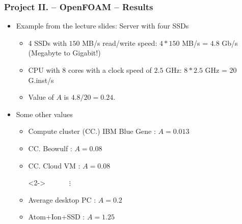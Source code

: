 \begin{frame}
\frametitle{Project II. -- OpenFOAM -- Results}

\begin{itemize}
	\item<1-> Example from the lecture slides: Server with four SSDs
	\begin{itemize}
		\item<1-> 4 SSDs with $150$ MB/s read/write speed: $4 * 150$ MB/s = $4.8$ Gb/s (Megabyte to Gigabit!)
		\item<1-> CPU with 8 cores with a clock speed of $2.5$ GHz: $8 * 2.5$ GHz = $20$ G.inst/s
		\item<1-> Value of $A$ is $4.8 / 20 = 0.24$.
	\end{itemize}
	\item<2-> Some other values
	\begin{itemize}
		\item<2-> Compute cluster (CC.) IBM Blue Gene : $A = 0.013$
		\item<2-> CC. Beowulf : $A = 0.08$
		\item<2-> CC. Cloud VM : $A = 0.08$
		\item[]<2-> $\quad\quad\quad\vdots$
		\item<2-> Average desktop PC : $A = 0.2$
		\item<2-> Atom+Ion+SSD : $A = 1.25$
	\end{itemize}
\end{itemize}

\end{frame}


